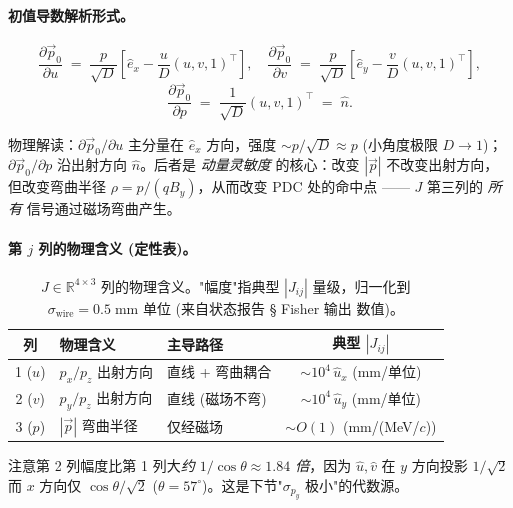 \paragraph{初值导数解析形式。}
\begin{equation}
  \frac{\partial\vec p_0}{\partial u}
  \;=\;\frac{p}{\sqrt{D}}\!\left[\hat e_x-\frac{u}{D}(u,v,1)^\top\right],\quad
  \frac{\partial\vec p_0}{\partial v}
  \;=\;\frac{p}{\sqrt{D}}\!\left[\hat e_y-\frac{v}{D}(u,v,1)^\top\right],
  \label{eq:partIa:fisher:p0_deriv_uv}
\end{equation}
\begin{equation}
  \frac{\partial\vec p_0}{\partial p}\;=\;\frac{1}{\sqrt{D}}(u,v,1)^\top \;=\;\hat n.
  \label{eq:partIa:fisher:p0_deriv_p}
\end{equation}

物理解读：$\partial\vec p_0/\partial u$ 主分量在 $\hat e_x$ 方向，强度 $\sim p/\sqrt{D}\approx p$ (小角度极限 $D\to 1$)；$\partial\vec p_0/\partial p$ 沿出射方向 $\hat n$。后者是 \emph{动量灵敏度} 的核心：改变 $|\vec p|$ 不改变出射方向，但改变弯曲半径 $\rho=p/(qB_y)$，从而改变 PDC 处的命中点 —— $J$ 第三列的 \emph{所有} 信号通过磁场弯曲产生。

\paragraph{第 $j$ 列的物理含义 (定性表)。}
\begin{table}[H]
\centering
\caption{$J\in\mathbb R^{4\times 3}$ 列的物理含义。"幅度"指典型 $|J_{ij}|$ 量级，归一化到 $\sigma_\mathrm{wire}=0.5\;\mathrm{mm}$ 单位 (来自状态报告 \StatusReport § Fisher 输出 数值)。}
\label{tab:partIa:fisher:Jcols}
\begin{tabular}{c l l c}
\toprule
列 & 物理含义 & 主导路径 & 典型 $|J_{ij}|$ \\
\midrule
1 ($u$) & $p_x/p_z$ 出射方向 & 直线 + 弯曲耦合 & $\sim 10^4\,\hat u_x$ (mm/单位) \\
2 ($v$) & $p_y/p_z$ 出射方向 & 直线 (磁场不弯) & $\sim 10^4\,\hat u_y$ (mm/单位) \\
3 ($p$) & $|\vec p|$ 弯曲半径 & 仅经磁场 & $\sim O(1)$ (mm/(MeV/$c$)) \\
\bottomrule
\end{tabular}
\end{table}

注意第 2 列幅度比第 1 列大\emph{约 $1/\cos\theta\approx 1.84$ 倍}，因为 $\hat u,\hat v$ 在 $y$ 方向投影 $1/\sqrt 2$ 而 $x$ 方向仅 $\cos\theta/\sqrt 2$ ($\theta=57^\circ$)。这是下节"$\sigma_{p_y}$ 极小"的代数源。

